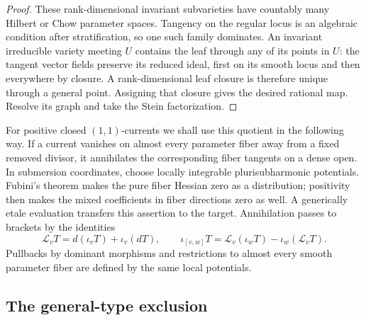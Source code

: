 \documentclass[11pt,letterpaper]{article}
\theoremstyle{definition}
\theoremstyle{remark}
\begin{document}
\begin{proof}
These rank-dimensional invariant subvarieties have countably many
Hilbert or Chow parameter spaces. Tangency on the regular locus is
an algebraic condition after stratification, so one such family
dominates. An invariant irreducible variety meeting \(U\) contains
the leaf through any of its points in \(U\): the tangent vector
fields preserve its reduced ideal, first on its smooth locus and
then everywhere by closure. A rank-dimensional leaf closure is
therefore unique through a general point. Assigning that closure
gives the desired rational map. Resolve its graph and take the
Stein factorization.
\end{proof}

For positive closed \((1,1)\)-currents we shall use this quotient in
the following way. If a current vanishes on almost every parameter
fiber away from a fixed removed divisor, it annihilates the
corresponding fiber tangents on a dense open. In submersion
coordinates, choose locally integrable plurisubharmonic potentials.
Fubini's theorem makes the pure fiber Hessian zero as a
distribution; positivity then makes the mixed coefficients in
fiber directions zero as well. A generically etale evaluation
transfers this assertion to the target. Annihilation passes to
brackets by the identities
\[
 \mathcal L_v T=d(\iota_vT)+\iota_v(dT),\qquad
 \iota_{[v,w]}T=\mathcal L_v(\iota_wT)-\iota_w(\mathcal L_vT).
\]
Pullbacks by dominant morphisms and restrictions to almost every
smooth parameter fiber are defined by the same local potentials.

\subsection{The general-type exclusion}
\end{document}
